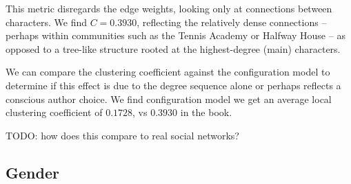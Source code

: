 This metric disregards the edge weights, looking only at connections between characters. We find $C = 0.3930$, reflecting the relatively dense connections -- perhaps within communities such as the Tennis Academy or Halfway House -- as opposed to a tree-like structure rooted at the highest-degree (main) characters.

We can compare the clustering coefficient against the configuration model to determine if this effect is due to the degree sequence alone or perhaps reflects a conscious author choice. We find configuration model we get an average local clustering coefficient of 0$.1728$, vs $0.3930$ in the book. 

TODO: how does this compare to real social networks?

\subsection{Gender}

